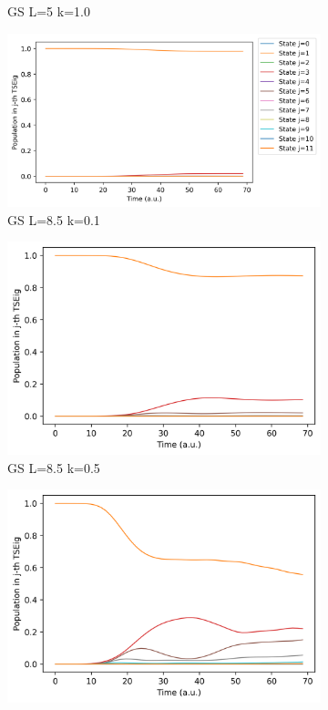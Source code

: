 \documentclass[11pt, a4paper]{article} %
\begin{document}
\begin{figure}[p]
\begin{subfigure}[b]{0.30\linewidth}
    \caption{GS L=5 k=1.0}
  \end{subfigure}
  \begin{subfigure}[b]{0.36\linewidth}
    \includegraphics[width=\linewidth]{Population_GS_L8.5_k0_0.1.png}
    \caption{GS L=8.5 k=0.1}
  \end{subfigure}
    \begin{subfigure}[b]{0.30\linewidth}
    \includegraphics[width=\linewidth]{Population_GS_L8.5_k0_0.5.png}
    \caption{GS L=8.5 k=0.5}
  \end{subfigure}  
  \begin{subfigure}[b]{0.30\linewidth}
    \includegraphics[width=\linewidth]{Population_GS_L8.5_k0_1.0.png}

\end{subfigure}
\end{figure}
\end{document}
